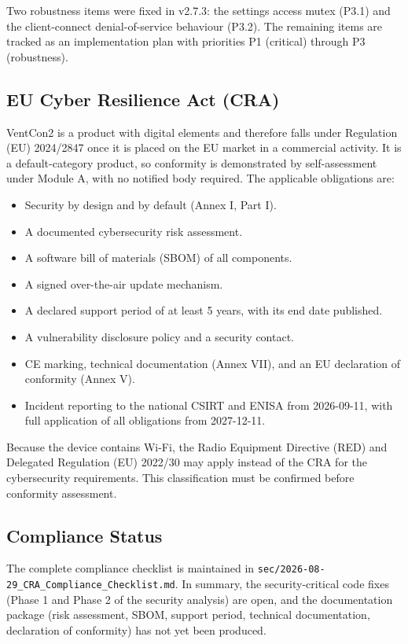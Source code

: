 Two robustness items were fixed in v2.7.3: the settings access mutex (P3.1) and the
client-connect denial-of-service behaviour (P3.2). The remaining items are tracked as
an implementation plan with priorities P1 (critical) through P3 (robustness).

\subsection{EU Cyber Resilience Act (CRA)}

VentCon2 is a product with digital elements and therefore falls under Regulation
(EU) 2024/2847 once it is placed on the EU market in a commercial activity. It is a
default-category product, so conformity is demonstrated by self-assessment under
Module A, with no notified body required. The applicable obligations are:

\begin{itemize}
    \item Security by design and by default (Annex I, Part I).
    \item A documented cybersecurity risk assessment.
    \item A software bill of materials (SBOM) of all components.
    \item A signed over-the-air update mechanism.
    \item A declared support period of at least 5 years, with its end date published.
    \item A vulnerability disclosure policy and a security contact.
    \item CE marking, technical documentation (Annex VII), and an EU declaration of
          conformity (Annex V).
    \item Incident reporting to the national CSIRT and ENISA from 2026-09-11, with
          full application of all obligations from 2027-12-11.
\end{itemize}

Because the device contains Wi-Fi, the Radio Equipment Directive (RED) and Delegated
Regulation (EU) 2022/30 may apply instead of the CRA for the cybersecurity
requirements. This classification must be confirmed before conformity assessment.

\subsection{Compliance Status}

The complete compliance checklist is maintained in
\texttt{sec/2026-08-29\_CRA\_Compliance\_Checklist.md}. In summary, the
security-critical code fixes (Phase 1 and Phase 2 of the security analysis) are open,
and the documentation package (risk assessment, SBOM, support period, technical
documentation, declaration of conformity) has not yet been produced.

